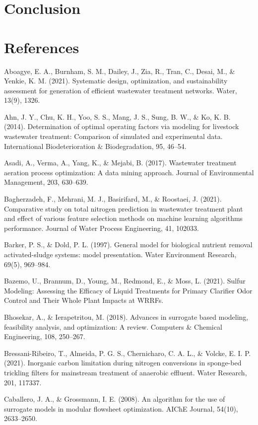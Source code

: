 \documentclass{article}
\begin{document}
\section{Conclusion}

\section{References}

Aboagye, E. A., Burnham, S. M., Dailey, J., Zia, R., Tran, C., Desai, M., \& Yenkie, K. M. (2021). Systematic design, optimization, and sustainability assessment for generation of efficient wastewater treatment networks. Water, 13(9), 1326.

Ahn, J. Y., Chu, K. H., Yoo, S. S., Mang, J. S., Sung, B. W., \& Ko, K. B. (2014). Determination of optimal operating factors via modeling for livestock wastewater treatment: Comparison of simulated and experimental data. International Biodeterioration \& Biodegradation, 95, 46–54.

Asadi, A., Verma, A., Yang, K., \& Mejabi, B. (2017). Wastewater treatment aeration process optimization: A data mining approach. Journal of Environmental Management, 203, 630–639.

Bagherzadeh, F., Mehrani, M. J., Basirifard, M., \& Roostaei, J. (2021). Comparative study on total nitrogen prediction in wastewater treatment plant and effect of various feature selection methods on machine learning algorithms performance. Journal of Water Process Engineering, 41, 102033.

Barker, P. S., \& Dold, P. L. (1997). General model for biological nutrient removal activated-sludge systems: model presentation. Water Environment Research, 69(5), 969–984.

Bazemo, U., Brannum, D., Young, M., Redmond, E., \& Moss, L. (2021). Sulfur Modeling: Assessing the Efficacy of Liquid Treatments for Primary Clarifier Odor Control and Their Whole Plant Impacts at WRRFs.

Bhosekar, A., \& Ierapetritou, M. (2018). Advances in surrogate based modeling, feasibility analysis, and optimization: A review. Computers \& Chemical Engineering, 108, 250–267.

Bressani-Ribeiro, T., Almeida, P. G. S., Chernicharo, C. A. L., \& Volcke, E. I. P. (2021). Inorganic carbon limitation during nitrogen conversions in sponge-bed trickling filters for mainstream treatment of anaerobic effluent. Water Research, 201, 117337.

Caballero, J. A., \& Grossmann, I. E. (2008). An algorithm for the use of surrogate models in modular flowsheet optimization. AIChE Journal, 54(10), 2633–2650.
\end{document}
